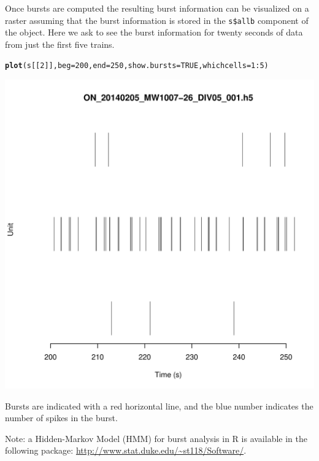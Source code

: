 \documentclass{article}\usepackage[]{graphicx}\usepackage[]{color}
\makeatletter
\def\maxwidth{ %
  \ifdim\Gin@nat@width>\linewidth
    \linewidth
  \else
    \Gin@nat@width
  \fi
}
\newcommand{\hlnum}[1]{\textcolor[rgb]{0.686,0.059,0.569}{#1}}%
\newcommand{\hlopt}[1]{\textcolor[rgb]{0,0,0}{#1}}%
\newcommand{\hlstd}[1]{\textcolor[rgb]{0.345,0.345,0.345}{#1}}%
\newcommand{\hlkwc}[1]{\textcolor[rgb]{0.333,0.667,0.333}{#1}}%
\newcommand{\hlkwd}[1]{\textcolor[rgb]{0.737,0.353,0.396}{\textbf{#1}}}%
\newenvironment{kframe}{%
 \def\at@end@of@kframe{}%
 \ifinner\ifhmode%
  \def\at@end@of@kframe{\end{minipage}}%
  \begin{minipage}{\columnwidth}%
 \fi\fi%
 \def\FrameCommand##1{\hskip\@totalleftmargin \hskip-\fboxsep
 \colorbox{shadecolor}{##1}\hskip-\fboxsep
     \hskip-\linewidth \hskip-\@totalleftmargin \hskip\columnwidth}%
 \MakeFramed {\advance\hsize-\width
   \@totalleftmargin\z@ \linewidth\hsize
   \@setminipage}}%
 {\par\unskip\endMakeFramed%
 \at@end@of@kframe}
\newenvironment{knitrout}{}{} %
\makeatother
\begin{document}
Once bursts are computed the resulting burst information can be
visualized on a raster assuming that the burst information is stored
in the \verb+s$allb+ component of the object.  Here we ask to see the
burst information for twenty seconds of data from just the first five trains.

\begin{knitrout}
\color{fgcolor}\begin{kframe}
\begin{alltt}
\hlkwd{plot}\hlstd{(s[[}\hlnum{2}\hlstd{]],} \hlkwc{beg} \hlstd{=} \hlnum{200}\hlstd{,} \hlkwc{end} \hlstd{=} \hlnum{250}\hlstd{,} \hlkwc{show.bursts} \hlstd{=} \hlnum{TRUE}\hlstd{,} \hlkwc{whichcells} \hlstd{=} \hlnum{1}\hlopt{:}\hlnum{5}\hlstd{)}
\end{alltt}
\end{kframe}
\includegraphics[width=\maxwidth]{figure/burst-raster} 

\end{knitrout}


Bursts are indicated with a red horizontal line, and the blue number
indicates the number of spikes in the burst.


Note: a Hidden-Markov Model (HMM) for burst analysis in R \citep{Tokdar2010}
is available in the following package:
\url{http://www.stat.duke.edu/~st118/Software/}.
\end{document}
